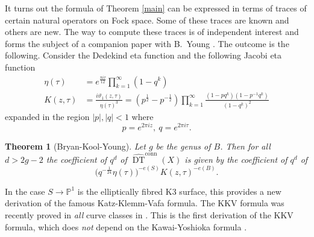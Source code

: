 \documentclass{amsart}
\newtheorem{theorem}{Theorem}%
\theoremstyle{definition}
\newcommand{\PP} {\mathbb{P}}
\newcommand{\DT}{\operatorname{DT}}
\newcommand{\conn}{\operatorname{conn}}
\begin{document}
It turns out the formula of Theorem \ref{main} can be expressed in terms of traces of certain natural operators on Fock space. Some of these traces are known and others are new. The way to compute these traces is of independent interest and forms the subject of a companion paper with B.~Young \cite{BKY}. The outcome is the following. Consider the Dedekind eta function and the following Jacobi eta function \cite{Cha}
\begin{align*}
\eta(\tau) &= e^{\frac{\pi i \tau}{12}}\prod_{k=1}^{\infty}(1-q^k) \\
K(z,\tau) &= \frac{i \vartheta_1(z,\tau)}{\eta(\tau)^3} = (p^{\frac{1}{2}} - p^{-\frac{1}{2}}) \prod_{k=1}^{\infty} \frac{(1-p q^k) (1-p^{-1} q^k)}{(1-q^k)^2}
\end{align*}
expanded in the region $|p|, |q| <1$ where 
$$
p = e^{2 \pi i z}, \ q = e^{2 \pi i \tau}.
$$
\begin{theorem}[Bryan-Kool-Young] 
Let $g$ be the genus of $B$. Then for all $d > 2g-2$ the coefficient of $q^d$ of $\widehat{\DT}^{\conn}(X)$ is given by the coefficient of $q^d$ of 
$$
\big(q^{-\frac{1}{24}}\eta(\tau) \big)^{-e(S)} K(z,\tau)^{-e(B)}.
$$
\end{theorem}
In the case $S \rightarrow \PP^1$ is the elliptically fibred K3 surface, this provides a new derivation of the famous Katz-Klemm-Vafa formula. The KKV formula was recently proved in \emph{all} curve classes in \cite{PT}. This is the first derivation of the KKV formula, which does \emph{not} depend on the Kawai-Yoshioka formula \cite{KY}.
\end{document}
